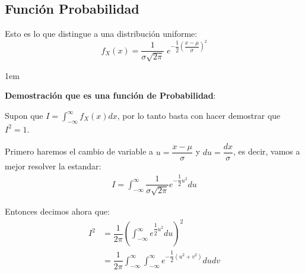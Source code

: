 \documentclass[12pt, fleqn]{report}                             %
\newenvironment{SmallIndentation}[1][0.75em]                    %
        {\begin{adjustwidth}{#1}{}\begin{footnotesize}}             %
        {\end{footnotesize}\end{adjustwidth}}                       %
\theoremstyle{break}                                            %
\newcommand{\Wrap}[1]           {\left( #1 \right)}             %
\newcommand{\pfrac}[2]      {\Wrap{\dfrac{#1}{#2}}}             %
\begin{document}
            \subsection{Función Probabilidad}

                Esto es lo que distingue a una distribución uniforme:
                \begin{equation*}
                    f_X(x) = \dfrac{1}{\sigma \sqrt{2\pi}} \; e^{-\dfrac{1}{2}\pfrac{x - \mu}{\sigma}^2 }
                \end{equation*}

                \begin{SmallIndentation}[1em]
                    \textbf{Demostración que es una función de Probabilidad}:
                    
                    Supon que $I = \int_{-\infty}^\infty f_X(x) dx$, por lo tanto basta con hacer
                    demostrar que $I^2 = 1$.

                    Primero haremos el cambio de variable a $u = \dfrac{x - \mu}{\sigma}$
                    y $du = \dfrac{dx}{\sigma}$, es decir, vamos a mejor resolver la estandar:
                    \begin{align*}
                        I
                            = \int_{-\infty}^\infty 
                                    \dfrac{1}{\sigma \sqrt{2\pi}} 
                                        e^{-\dfrac{1}{2}u^2 } du
                    \end{align*}

                    Entonces decimos ahora que:
                    \begin{align}
                        I^2
                            &= \dfrac{1}{2\pi} \Wrap{\int_{-\infty}^\infty e^{\dfrac{1}{2}u^2} du}^2    \\
                            &= \dfrac{1}{2\pi} 
                                \int_{-\infty}^\infty 
                                    \int_{-\infty}^\infty e^{-\dfrac{1}{2}(u^2 + v^2)} du dv 
                    \end{align}


\end{SmallIndentation}
\end{document}
